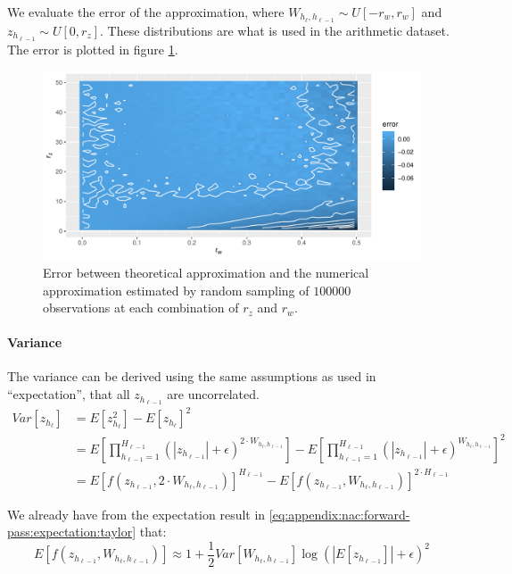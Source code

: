 We evaluate the error of the approximation, where $W_{h_{\ell}, h_{\ell-1}} \sim U[-r_w,r_w]$ and $z_{h_{\ell-1}} \sim U[0, r_z]$. These distributions are what is used in the  arithmetic dataset. The error is plotted in figure \ref{fig:nac-mul-expectation-estimate}.
\begin{figure}[h]
\centering
\includegraphics[width=\linewidth]{graphics/nac-mul-expectation-estimate.pdf}
\caption{Error between theoretical approximation and the numerical approximation estimated by random sampling of $100000$ observations at each combination of $r_z$ and $r_w$.}
\label{fig:nac-mul-expectation-estimate}
\end{figure}

\paragraph{Variance} The variance can be derived using the same assumptions as used in ``expectation'', that all $z_{h_{\ell-1}}$ are uncorrelated.
\begin{equation}
\begin{aligned}
Var[z_{h_\ell}] &= E[z_{h_\ell}^2] - E[z_{h_\ell}]^2 \\
&= E\left[\prod_{h_{\ell-1}=1}^{H_{\ell-1}} (|z_{h_{\ell-1}}| + \epsilon)^{2 \cdot W_{h_{\ell}, h_{\ell-1}}} \right]
- E\left[\prod_{h_{\ell-1}=1}^{H_{\ell-1}} (|z_{h_{\ell-1}}| + \epsilon)^{W_{h_{\ell}, h_{\ell-1}}}\right]^2 \\
&= E\left[f(z_{h_{\ell-1}}, 2 \cdot W_{h_{\ell}, h_{\ell-1}}) \right]^{H_{\ell-1}}
- E\left[f(z_{h_{\ell-1}}, W_{h_{\ell}, h_{\ell-1}})\right]^{2\cdot H_{\ell-1}}
\end{aligned}
\end{equation}

We already have from the expectation result in \eqref{eq:appendix:nac:forward-pass:expectation:taylor} that:
\begin{equation}
E\left[f(z_{h_{\ell-1}}, W_{h_{\ell}, h_{\ell-1}})\right] \approx 1 + \frac{1}{2} Var[W_{h_{\ell}, h_{\ell-1}}] \log(|E[z_{h_{\ell-1}}]| + \epsilon)^2
\end{equation}

